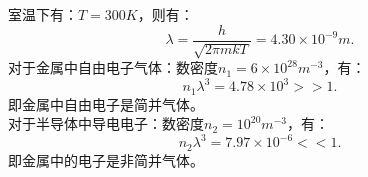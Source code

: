 \documentclass[a4paper,12pt]{article}
\begin{document}
\section{}
室温下有：$T = 300K$，则有：
\begin{equation*}
	\lambda = \frac{h}{\sqrt{2\pi mkT}} = 4.30\times 10^{-9}m.
\end{equation*}
对于金属中自由电子气体：数密度$n_1 = 6\times 10^{28}m^{-3}$，有：
\begin{equation*}
	n_1\lambda^3 = 4.78\times 10^3 >> 1.
\end{equation*}
即金属中自由电子是简并气体。\\
对于半导体中导电电子：数密度$n_2 = 10^{20}m^{-3}$，有：
\begin{equation*}
	n_2\lambda^3 = 7.97\times 10^{-6} << 1.
\end{equation*}
即金属中的电子是非简并气体。
\end{document}
